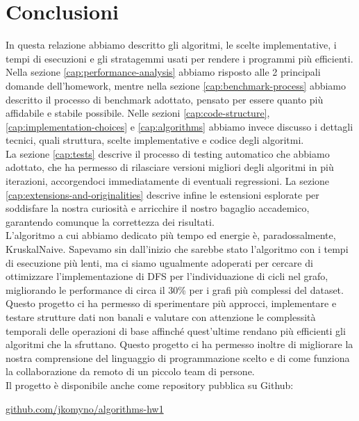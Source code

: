 \section{Conclusioni}
\label{cap:conclusions}

In questa relazione abbiamo descritto gli algoritmi, le scelte implementative, i tempi di esecuzioni e gli stratagemmi usati per rendere i programmi più efficienti. \\

\noindent Nella sezione \ref{cap:performance-analysis} abbiamo risposto alle 2 principali domande dell'homework, mentre nella sezione \ref{cap:benchmark-process} abbiamo descritto il processo di benchmark adottato, pensato per essere quanto più affidabile e stabile possibile.
Nelle sezioni \ref{cap:code-structure}, \ref{cap:implementation-choices} e \ref{cap:algorithms} abbiamo invece discusso i dettagli tecnici, quali struttura, scelte implementative e codice degli algoritmi. \\

\noindent  La sezione \ref{cap:tests} descrive il processo di testing automatico che abbiamo adottato, che ha permesso di rilasciare versioni migliori degli algoritmi in più iterazioni, accorgendoci immediatamente di eventuali regressioni. La sezione \ref{cap:extensions-and-originalities} descrive infine le estensioni esplorate per soddisfare la nostra curiosità e arricchire il nostro bagaglio accademico, garantendo comunque la correttezza dei risultati. \\

\noindent L'algoritmo a cui abbiamo dedicato più tempo ed energie è, paradossalmente, KruskalNaive. Sapevamo sin dall'inizio che sarebbe stato l'algoritmo con i tempi di esecuzione più lenti, ma ci siamo ugualmente adoperati per cercare di ottimizzare l'implementazione di DFS per l'individuazione di cicli nel grafo, migliorando le performance di circa il 30\% per i grafi più complessi del dataset.\\

\noindent Questo progetto ci ha permesso di sperimentare più approcci, implementare e testare strutture dati non banali e valutare con attenzione le complessità temporali delle operazioni di base affinché quest'ultime rendano più efficienti gli algoritmi che la sfruttano. Questo progetto ci ha permesso inoltre di migliorare la nostra comprensione del linguaggio di programmazione scelto e di come funziona la collaborazione da remoto di un piccolo team di persone. \\

\noindent Il progetto è disponibile anche come repository pubblica su Github:

\begin{center}
\href{https://github.com/jkomyno/algorithms-hw1}{github.com/jkomyno/algorithms-hw1}
\end{center}
